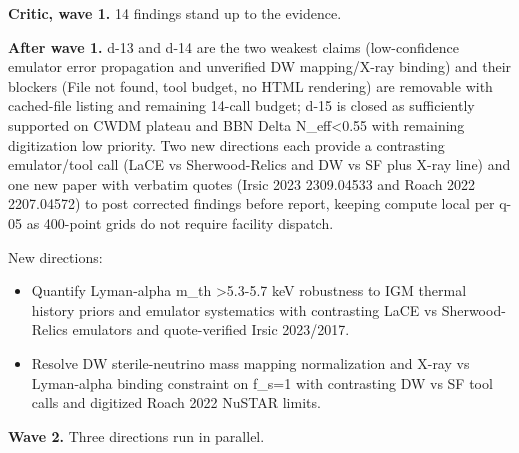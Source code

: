 \documentclass[11pt,a4paper]{article}
\begin{document}
\textbf{Critic, wave 1.} 14 findings stand up to the evidence.

\textbf{After wave 1.} d-13 and d-14 are the two weakest claims (low-confidence emulator error propagation and unverified DW mapping/X-ray binding) and their blockers (File not found, tool budget, no HTML rendering) are removable with cached-file listing and remaining 14-call budget; d-15 is closed as sufficiently supported on CWDM plateau and BBN Delta N\_eff\textless{}0.55 with remaining digitization low priority. Two new directions each provide a contrasting emulator/tool call (LaCE vs Sherwood-Relics and DW vs SF plus X-ray line) and one new paper with verbatim quotes (Irsic 2023 2309.04533 and Roach 2022 2207.04572) to post corrected findings before report, keeping compute local per q-05 as 400-point grids do not require facility dispatch.

New directions:

\begin{itemize}
  \item Quantify Lyman-alpha m\_th \textgreater{}5.3-5.7 keV robustness to IGM thermal history priors and emulator systematics with contrasting LaCE vs Sherwood-Relics emulators and quote-verified Irsic 2023/2017.
  \item Resolve DW sterile-neutrino mass mapping normalization and X-ray vs Lyman-alpha binding constraint on f\_s=1 with contrasting DW vs SF tool calls and digitized Roach 2022 NuSTAR limits.
\end{itemize}
\textbf{Wave 2.} Three directions run in parallel.
\end{document}
